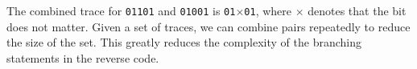 \documentclass[12pt]{gatech-thesis}
\begin{document}
The combined trace for \texttt{01101} and \texttt{01001} is \texttt{01$\times$01}, where $\times$ denotes that the bit does not matter. 
Given a set of traces, we can combine pairs repeatedly to reduce the size of the set.
This greatly reduces the complexity of the branching statements in the reverse code. 

\end{document}
